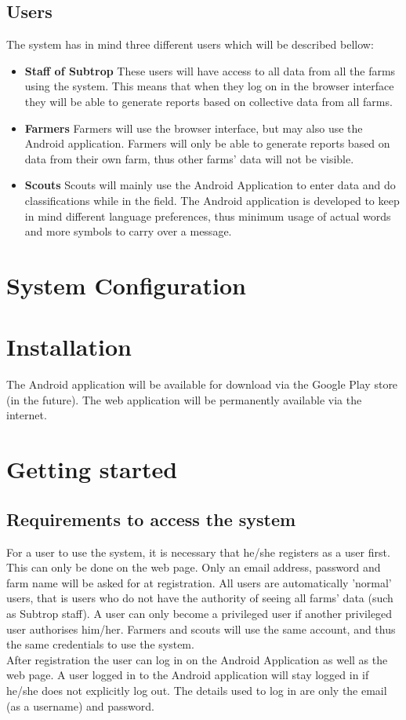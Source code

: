 \documentclass[11pt,a4paper,titlepage]{article}
\begin{document}
\subsection{Users}
The system has in mind three different users which will be described bellow:
	\begin{itemize}
		\item \textbf{Staff of Subtrop} These users will have access to all data from all the farms using the system. This means that when they log on in the browser interface they will be able to generate reports based on collective data from all farms.
		\item \textbf{Farmers} Farmers will use the browser interface, but may also use the Android application. Farmers will only be able to generate reports based on data from their own farm, thus other farms' data will not be visible. 
		\item \textbf{Scouts} Scouts will mainly use the Android Application to enter data and do classifications while in the field. The Android application is developed to keep in mind different language preferences, thus minimum usage of actual words and more symbols to carry over a message.
	\end{itemize}



\section{System Configuration}

\section{Installation}
The Android application will be available for download via the Google Play store (in the future). The web application will be permanently available via the internet.
		
\section{Getting started}
\subsection{Requirements to access the system}
For a user to use the system, it is necessary that he/she registers as a user first. This can only be done on the web page. Only an email address, password and farm name will be asked for at registration. All users are automatically 'normal' users, that is users who do not have the authority of seeing all farms' data (such as Subtrop staff). A user can only become a privileged user if another privileged user authorises him/her. Farmers and scouts will use the same account, and thus the same credentials to use the system.\\
After registration the user can log in on the Android Application as well as the web page. A user logged in to the Android application will stay logged in if he/she does not explicitly log out. The details used to log in are only the email (as a username) and password.
\end{document}
